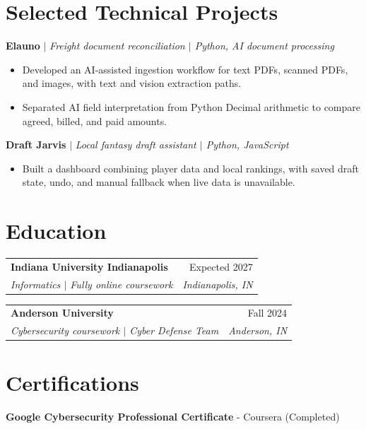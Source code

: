 \documentclass[10pt,letterpaper]{article}
\makeatletter
\newcommand{\role}[4]{%
  \begin{tabularx}{\textwidth}{@{}Xr@{}}
    \textbf{#1} & #2 \\
    \textit{#3} & \textit{#4}
  \end{tabularx}\vspace{-1pt}
}
\newcommand{\project}[2]{\textbf{#1} $|$ \textit{#2}\par}
\newcommand{\entrygap}{\vspace{3pt}}
\makeatother
\begin{document}
\section{Selected Technical Projects}
\project{Elauno}{Freight document reconciliation $|$ Python, AI document processing}
\begin{itemize}
  \item Developed an AI-assisted ingestion workflow for text PDFs, scanned PDFs, and images, with text and vision extraction paths.
  \item Separated AI field interpretation from Python Decimal arithmetic to compare agreed, billed, and paid amounts.
\end{itemize}
\entrygap
\project{Draft Jarvis}{Local fantasy draft assistant $|$ Python, JavaScript}
\begin{itemize}
  \item Built a dashboard combining player data and local rankings, with saved draft state, undo, and manual fallback when live data is unavailable.
\end{itemize}

\section{Education}
\role{Indiana University Indianapolis}{Expected 2027}{Informatics $|$ Fully online coursework}{Indianapolis, IN}
\entrygap
\role{Anderson University}{Fall 2024}{Cybersecurity coursework $|$ Cyber Defense Team}{Anderson, IN}

\section{Certifications}
\textbf{Google Cybersecurity Professional Certificate} - Coursera (Completed)
\end{document}
